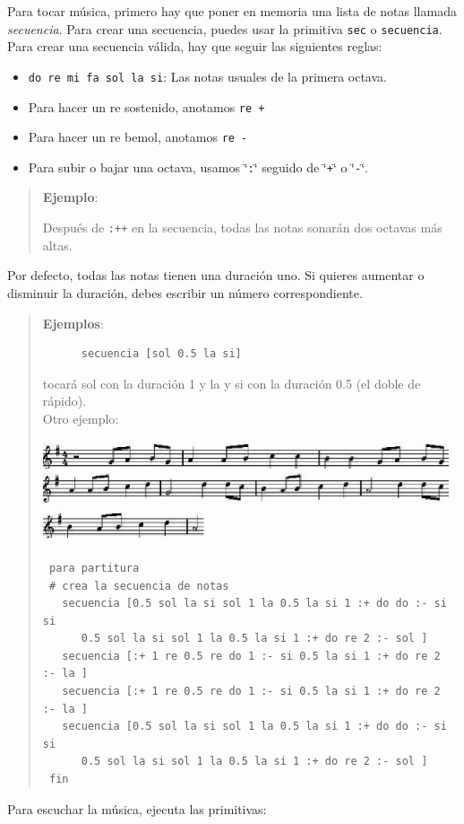 Para tocar m\'usica, primero hay que poner en memoria una lista de notas
llamada \textit{secuencia}. Para crear una secuencia, puedes usar
la primitiva \texttt{sec} o \texttt{secuencia}. Para crear una secuencia
v\'alida, hay que seguir las siguientes reglas: 
\begin{itemize}
   \item \texttt{do re mi fa sol la si}: Las notas usuales de la primera
      octava. 
   \item Para hacer un re sostenido, anotamos \texttt{re +} 
   \item Para hacer un re bemol, anotamos \texttt{re -}
   \item Para subir o bajar una octava, usamos \char`\"{}\texttt{:}\char`\"{}
      seguido de \char`\"{}\texttt{+}\char`\"{} o \char`\"{}\texttt{-}\char`\"{}. 
\end{itemize}
\begin{quote}
   \noindent \textbf{Ejemplo}:

   Despu\'es de \texttt{:++} en la secuencia, todas las notas sonar\'an dos
   octavas m\'as altas.
\end{quote}
Por defecto, todas las notas tienen una duraci\'on uno. Si quieres aumentar
o disminuir la duraci\'on, debes escribir un n\'umero correspondiente. \\

\begin{quote}
   \noindent \textbf{Ejemplos}: 
   \begin{verbatim}
      secuencia [sol 0.5 la si] \end{verbatim}
   tocar\'a sol con la duraci\'on 1 y la y si con la duraci\'on 0.5 (el doble
   de r\'apido). \\

   Otro ejemplo:
   \begin{center}
      \includegraphics[width=120mm]{Imagenes/09_Musica/musica.png}
   \end{center}
   \begin{verbatim}
 para partitura
 # crea la secuencia de notas
   secuencia [0.5 sol la si sol 1 la 0.5 la si 1 :+ do do :- si si 
      0.5 sol la si sol 1 la 0.5 la si 1 :+ do re 2 :- sol ]
   secuencia [:+ 1 re 0.5 re do 1 :- si 0.5 la si 1 :+ do re 2 :- la ]
   secuencia [:+ 1 re 0.5 re do 1 :- si 0.5 la si 1 :+ do re 2 :- la ]
   secuencia [0.5 sol la si sol 1 la 0.5 la si 1 :+ do do :- si si 
      0.5 sol la si sol 1 la 0.5 la si 1 :+ do re 2 :- sol ]
 fin \end{verbatim}
\end{quote}
Para escuchar la m\'usica, ejecuta las primitivas:


